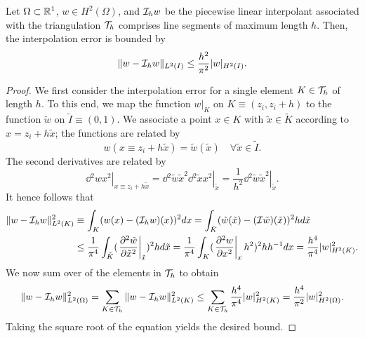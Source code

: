 \begin{proposition}
  \label{prop:th_lin_interp_L2}
  Let $\Omega \subset \mathbb{R}^1$, $w \in H^2(\Omega)$, and $\mathcal{I}_h w$ be the piecewise linear interpolant associated with the triangulation $\mathcal{T}_h$ comprises line segments of maximum length $h$. Then, the interpolation error is bounded by
  \begin{equation*}
    \| w - \mathcal{I}_h w \|_{L^2(I)}
    \leq \frac{h^2}{\pi^2} | w |_{H^2(I)}.
  \end{equation*}
  \begin{proof}
    We first consider the interpolation error for a single element $K \in \mathcal{T}_h$ of length $h$. To this end, we map the function $w|_K$ on $K \equiv (z_i,z_i+h)$ to the function $\tilde w$ on $\tilde I \equiv (0,1)$. We associate a point $x \in K$ with $\tilde x \in \tilde K$ according to $x = z_i + h \tilde x$; the functions are related by
    \begin{equation*}
      w(x \equiv z_i + h \tilde x) = \tilde w(\tilde x) \quad \forall \tilde x \in \tilde I.
    \end{equation*}
    The second derivatives are related by
    \begin{equation*}
      \left. \dd{^2 w}{x^2} \right|_{x \equiv z_i + h \tilde x}
      = \left. \dd{^2 \tilde w}{\tilde x^2} \dd{^2 \tilde x}{x^2} \right|_{\tilde x}
      = \frac{1}{h^2} \left. \dd{^2 \tilde w}{\tilde x^2} \right|_{\tilde x}.
    \end{equation*}
    It hence follows that
    \begin{align*}
      \| w - \mathcal{I}_h w \|_{L^2(K)}^2
      &\equiv
      \int_{K} ( w(x) - (\mathcal{I}_h w)(x) )^2 dx
      =
      \int_{\tilde K} (\tilde w(\tilde x) - (\mathcal{I} \tilde w)(\tilde x))^2 h d \tilde x
      \\
      &\leq
      \frac{1}{\pi^4} \int_{\tilde K} (\left. \frac{\partial ^2\tilde w}{\partial \tilde x^2} \right|_{\tilde x})^2 h d \tilde x
      =
      \frac{1}{\pi^4} \int_{K} (\left. \frac{\partial ^2 w}{\partial x^2} \right|_x h^2 )^2 h h^{-1} d x
      = \frac{h^4}{\pi^4} | w |_{H^2(K)}^2.
    \end{align*}
    We now sum over of the elements in $\mathcal{T}_h$ to obtain
    \begin{equation*}
      \| w - \mathcal{I}_h w \|_{L^2(\Omega)}^2
      =
      \sum_{K \in \mathcal{T}_h} \| w - \mathcal{I}_h w \|_{L^2(K)}^2
      \leq
      \sum_{K \in \mathcal{T}_h} \frac{h^4}{\pi^4} | w |^2_{H^2(K)}
      = \frac{h^4}{\pi^2} | w |^2_{H^2(\Omega)}.
    \end{equation*}
    Taking the square root of the equation yields the desired bound.
  \end{proof}
\end{proposition}
